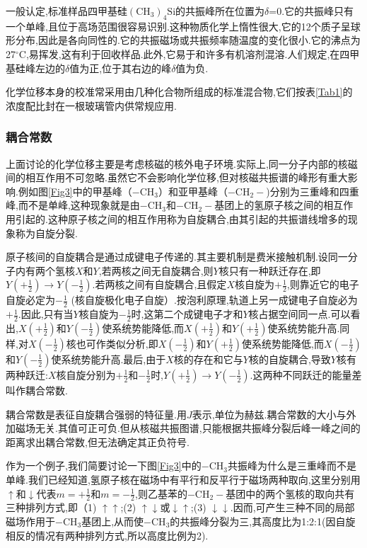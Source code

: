 \documentclass[a4paper]{article}
\begin{document}
一般认定,标准样品四甲基硅$(\text{CH}_3)_4\text{Si}$的共振峰所在位置为$\delta$=0.它的共振峰只有一个单峰,且位于高场范围很容易识别.这种物质化学上惰性很大,它的12个质子呈球形分布,因此是各向同性的.它的共振磁场或共振频率随温度的变化很小.它的沸点为27$^\circ$C,易挥发,这有利于回收样品.此外,它易于和许多有机溶剂混溶.人们规定,在四甲基硅峰左边的$\delta$值为正,位于其右边的峰$\delta$值为负.

化学位移本身的校准常采用由几种化合物所组成的标准混合物,它们按表\ref{Tab1}的浓度配比封在一根玻璃管内供常规应用.

\subsubsection{耦合常数}

上面讨论的化学位移主要是考虑核磁的核外电子环境.实际上,同一分子内部的核磁间的相互作用不可忽略.虽然它不会影响化学位移,但对核磁共振谱的峰形有重大影响.例如图\ref{Fig3}中的甲基峰（$-\text{CH}_3$）和亚甲基峰（$-\text{CH}_2-$)分别为三重峰和四重峰,而不是单峰,这种现象就是由$-\text{CH}_3$和$-\text{CH}_2-$基团上的氢原子核之间的相互作用引起的.这种原子核之间的相互作用称为自旋耦合,由其引起的共振谱线增多的现象称为自旋分裂.

原子核间的自旋耦合是通过成键电子传递的.其主要机制是费米接触机制.设同一分子内有两个氢核$X$和$Y$,若两核之间无自旋耦合,则$Y$核只有一种跃迁存在,即$Y\left(+\frac{1}{2}\right)\to Y\left(-\frac{1}{2}\right)$.若两核之间有自旋耦合,且假定$X$核自旋为$+\frac{1}{2}$,则靠近它的电子自旋必定为$-\frac{1}{2}$ (核自旋极化电子自旋）.按泡利原理,轨道上另一成键电子自旋必为$+\frac{1}{2}$.因此,只有当$Y$核自旋为$-\frac{1}{2}$时,这第二个成键电子才和$Y$核占据空间同一点.可以看出,$X\left(+\frac{1}{2}\right)$和$Y\left(-\frac{1}{2}\right)$使系统势能降低,而$X\left(+\frac{1}{2}\right)$和$Y\left(+\frac{1}{2}\right)$使系统势能升高.同样,对$X\left(-\frac{1}{2}\right)$核也可作类似分析,即$X\left(-\frac{1}{2}\right)$和$Y\left(+\frac{1}{2}\right)$使系统势能降低,而$X\left(-\frac{1}{2}\right)$和$Y\left(-\frac{1}{2}\right)$使系统势能升高.最后,由于$X$核的存在和它与$Y$核的自旋耦合,导致$Y$核有两种跃迁:$X$核自旋分别为$+\frac{1}{2}$和$-\frac{1}{2}$时,$Y\left(+\frac{1}{2}\right)\to Y\left(-\frac{1}{2}\right)$.这两种不同跃迁的能量差叫作耦合常数.

耦合常数是表征自旋耦合强弱的特征量.用$J$表示,单位为赫兹.耦合常数的大小与外加磁场无关.其值可正可负.但从核磁共振图谱,只能根据共振峰分裂后峰一峰之间的距离求出耦合常数,但无法确定其正负符号.

作为一个例子,我们简要讨论一下图\ref{Fig3}中的$-\text{CH}_3$共振峰为什么是三重峰而不是单峰.我们已经知道,氢原子核在磁场中有平行和反平行于磁场两种取向,这里分别用$\uparrow$和$\downarrow$代表$m=+\frac{1}{2}$和$m=-\frac{1}{2}$,则乙基苯的$-\text{CH}_2-$基团中的两个氢核的取向共有三种排列方式,即（1) $\uparrow\uparrow$;(2) $\uparrow\downarrow$或$\downarrow\uparrow$;(3) $\downarrow\downarrow$.因而,可产生三种不同的局部磁场作用于$-\text{CH}_3$基团上,从而使$-\text{CH}_3$的共振峰分裂为三,其高度比为1:2:1(因自旋相反的情况有两种排列方式,所以高度比例为2).
\end{document}
